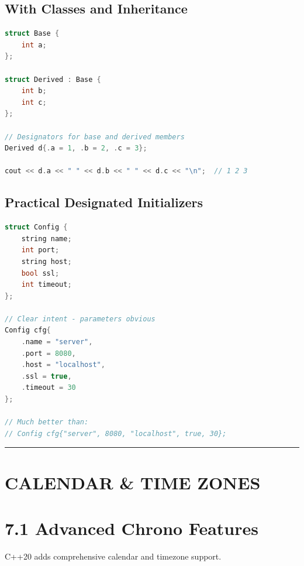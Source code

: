 \hypertarget{with-classes-and-inheritance}{%
\subsection{With Classes and
Inheritance}\label{with-classes-and-inheritance}}

\begin{lstlisting}[language={C++}]
struct Base {
    int a;
};

struct Derived : Base {
    int b;
    int c;
};

// Designators for base and derived members
Derived d{.a = 1, .b = 2, .c = 3};

cout << d.a << " " << d.b << " " << d.c << "\n";  // 1 2 3
\end{lstlisting}

\hypertarget{practical-designated-initializers}{%
\subsection{Practical Designated
Initializers}\label{practical-designated-initializers}}

\begin{lstlisting}[language={C++}]
struct Config {
    string name;
    int port;
    string host;
    bool ssl;
    int timeout;
};

// Clear intent - parameters obvious
Config cfg{
    .name = "server",
    .port = 8080,
    .host = "localhost",
    .ssl = true,
    .timeout = 30
};

// Much better than:
// Config cfg{"server", 8080, "localhost", true, 30};
\end{lstlisting}

\begin{center}\rule{0.5\linewidth}{0.5pt}\end{center}

\hypertarget{calendar-time-zones}{%
\section{CALENDAR \& TIME ZONES}\label{calendar-time-zones}}

\hypertarget{advanced-chrono-features}{%
\section{7.1 Advanced Chrono Features}\label{advanced-chrono-features}}

C++20 adds comprehensive calendar and timezone support.

